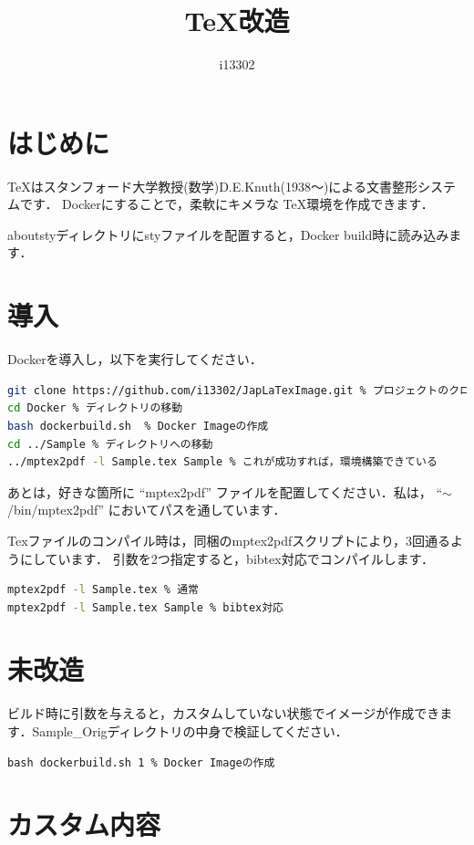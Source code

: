 \documentclass[10pt]{jarticle}
\title{\TeX 改造}
\author{i13302}
\date{\warekitoday}
\begin{document}
 
\maketitle 
\section{はじめに}
\TeX はスタンフォード大学教授(数学)D.E.Knuth(1938～)による文書整形システムです\cite{TeX入門}．
Dockerにすることで，柔軟にキメラな \TeX 環境を作成できます．
\par 
aboutstyディレクトリにstyファイルを配置すると，Docker build時に読み込みます．

\section{導入}
Dockerを導入し，以下を実行してください．
\begin{lstlisting}[language=bash, caption=導入]
git clone https://github.com/i13302/JapLaTexImage.git % プロジェクトのクローン
cd Docker % ディレクトリの移動
bash dockerbuild.sh  % Docker Imageの作成
cd ../Sample % ディレクトリへの移動
../mptex2pdf -l Sample.tex Sample % これが成功すれば，環境構築できている
\end{lstlisting}
\par あとは，好きな箇所に ``mptex2pdf'' ファイルを配置してください．私は， ``$\sim$/bin/mptex2pdf'' においてパスを通しています．
\par Texファイルのコンパイル時は，同梱のmptex2pdfスクリプトにより，3回通るようにしています．
引数を2つ指定すると，bibtex対応でコンパイルします．
\begin{lstlisting}[language=bash, caption=コンパイル]
mptex2pdf -l Sample.tex % 通常
mptex2pdf -l Sample.tex Sample % bibtex対応
\end{lstlisting}

\section{未改造}
ビルド時に引数を与えると，カスタムしていない状態でイメージが作成できます．Sample\_Origディレクトリの中身で検証してください．
\begin{lstlisting}[caption=未改造導入]
bash dockerbuild.sh 1 % Docker Imageの作成
\end{lstlisting}

\section{カスタム内容}
\end{document}
